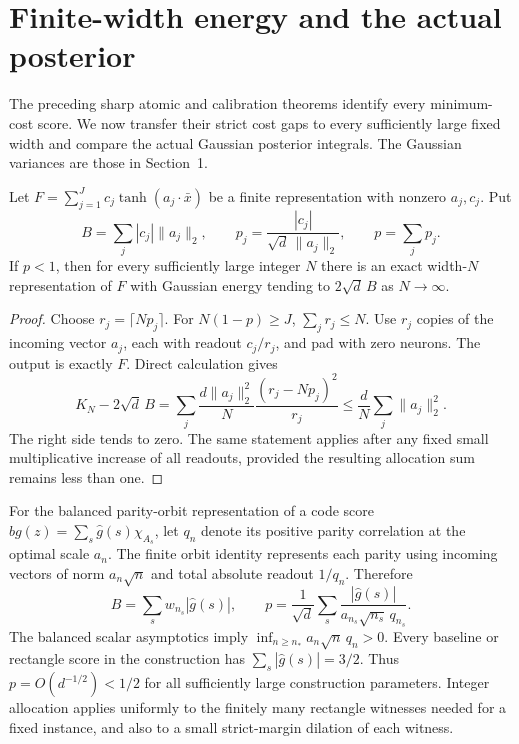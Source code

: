 \section{Finite-width energy and the actual posterior}
\label{app:posterior}

The preceding sharp atomic and calibration theorems identify every
minimum-cost score. We now transfer their strict cost gaps to every
sufficiently large fixed width and compare the actual Gaussian
posterior integrals. The Gaussian variances are those in Section~1.

\begin{lemma}
Let $F=\sum_{j=1}^J c_j\tanh(a_j\cdot\bar x)$ be a finite
representation with nonzero $a_j,c_j$. Put
\[
 B=\sum_j|c_j|\|a_j\|_2,\qquad
 p_j=\frac{|c_j|}{\sqrt d\,\|a_j\|_2},\qquad p=\sum_jp_j.
\]
If $p<1$, then for every sufficiently large integer $N$ there is an
exact width-$N$ representation of $F$ with Gaussian energy tending to
$2\sqrt d\,B$ as $N\to\infty$.
\end{lemma}
\begin{proof}
Choose $r_j=\lceil Np_j\rceil$. For $N(1-p)\ge J$,
$\sum_jr_j\le N$. Use $r_j$ copies of the incoming vector $a_j$,
each with readout $c_j/r_j$, and pad with zero neurons. The output is
exactly $F$. Direct calculation gives
\[
 K_N-2\sqrt d\,B
 =\sum_j\frac{d\|a_j\|_2^2}{N}
                \frac{(r_j-Np_j)^2}{r_j}
 \le\frac dN\sum_j\|a_j\|_2^2.
\]
The right side tends to zero. The same statement applies after any
fixed small multiplicative increase of all readouts, provided the
resulting allocation sum remains less than one.
\end{proof}

For the balanced parity-orbit representation of a code score
$bg(z)=\sum_s\widehat g(s)\chi_{A_s}$, let $q_n$ denote its
positive parity correlation at the optimal scale $a_n$. The finite
orbit identity represents each parity using incoming vectors of norm
$a_n\sqrt n$ and total absolute readout $1/q_n$. Therefore
\[
 B=\sum_s w_{n_s}|\widehat g(s)|,
 \qquad
 p=\frac1{\sqrt d}\sum_s
       \frac{|\widehat g(s)|}{a_{n_s}\sqrt{n_s}\,q_{n_s}}.
\]
The balanced scalar asymptotics imply
$\inf_{n\ge n_*}a_n\sqrt n\,q_n>0$. Every baseline or rectangle
score in the construction has
$\sum_s|\widehat g(s)|=3/2$. Thus $p=O(d^{-1/2})<1/2$ for all
sufficiently large construction parameters. Integer allocation applies
uniformly to the finitely many rectangle witnesses needed for a fixed
instance, and also to a small strict-margin dilation of each witness.

